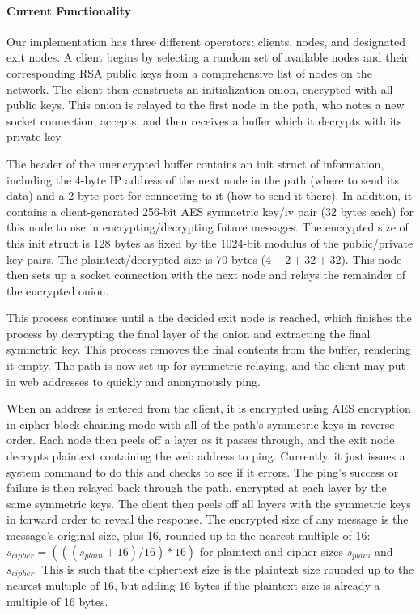 \documentclass[12pt]{article}
\begin{document}
\paragraph{Current Functionality}
Our implementation has three different operators: clients, nodes, and designated exit nodes. A client begins by selecting a random set of available nodes and their corresponding RSA public keys from a comprehensive list of nodes on the network. The client then constructs an initialization onion, encrypted with all public keys. This onion is relayed to the first node in the path, who notes a new socket connection, accepts, and then receives a buffer which it decrypts with its private key.

The header of the unencrypted buffer contains an init struct of information, including the 4-byte IP address of the next node in the path (where to send its data) and a 2-byte port for connecting to it (how to send it there). In addition, it contains a client-generated 256-bit AES symmetric key/iv pair (32 bytes each) for this node to use in encrypting/decrypting future messages. The encrypted size of this init struct is 128 bytes as fixed by the 1024-bit modulus of the public/private key pairs. The plaintext/decrypted size is 70 bytes ($4+2+32+32$). This node then sets up a socket connection with the next node and relays the remainder of the encrypted onion.

This process continues until a the decided exit node is reached, which finishes the process by decrypting the final layer of the onion and extracting the final symmetric key. This process removes the final contents from the buffer, rendering it empty. The path is now set up for symmetric relaying, and the client may put in web addresses to quickly and anonymously ping.

When an address is entered from the client, it is encrypted using AES encryption in cipher-block chaining mode with all of the path's symmetric keys in reverse order. Each node then peels off a layer as it passes through, and the exit node decrypts plaintext containing the web address to ping. Currently, it just issues a system command to do this and checks to see if it errors. The ping's success or failure is then relayed back through the path, encrypted at each layer by the same symmetric keys. The client then peels off all layers with the symmetric keys in forward order to reveal the response. The encrypted size of any message is the message's original size, plus 16, rounded up to the nearest multiple of 16: $s_{cipher} = (((s_{plain}+16)/16)*16)$ for plaintext and cipher sizes $s_{plain}$ and $s_{cipher}$. This is such that the ciphertext size is the plaintext size rounded up to the nearest multiple of 16, but adding 16 bytes if the plaintext size is already a multiple of 16 bytes.
\end{document}
